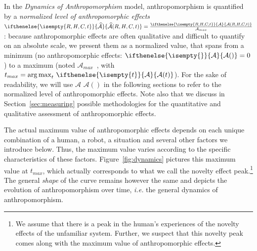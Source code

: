 \documentclass{frontiersSCNS} %
\newcommand{\ie}{\textit{i.e.}\xspace}
\newcommand{\Ant}[1][]{%
      \ifthenelse{\isempty{#1}}%
        {$\mathcal{A}$}
        {$\mathcal{A}(#1)$}
}
\newcommand{\ant}[1][]{%
      \ifthenelse{\isempty{#1}}%
        {\mathcal{A}}
        {\mathcal{A}(#1)}
}
\newcommand{\antNorm}[1][]{%
      \ifthenelse{\isempty{#1}}%
      {\widehat{\mathcal{A}}}
      {\widehat{\mathcal{A}}(#1)}
}
\newcommand{\AntMax}{{$\mathcal{A}_{max}$~}}
\newcommand{\antMax}{{\mathcal{A}_{max}}}
\begin{document}
In the \emph{Dynamics of Anthropomorphism} model, anthropomorphism is quantified
by a \emph{normalized level of anthropomorphic effects} $\antNorm[R,H,C,t] =
\frac{\ant[R,H,C,t]}{\antMax}$: because anthropomorphic effects are often
qualitative and difficult to quantify on an absolute scale, we present them as a
normalized value, that spans from a minimum (no anthropomorphic effects:
$\ant=0$) to a maximum (noted \AntMax, with $t_{max} = \operatorname{arg\,max}_t
\, \ant[t]$). For the sake of readability, we will use \Ant in the following
sections to refer to the normalized level of anthropomorphic effects. Note also
that we discuss in Section~\ref{sec:measuring} possible methodologies for the
quantitative and qualitative assessment of anthropomorphic effects.

The actual maximum value of anthropomorphic effects depends on each unique
combination of a human, a robot, a situation and several other factors we
introduce below. Thus, the maximum value varies according to the specific
characteristics of these factors. Figure~\ref{fig:dynamics} pictures this
maximum value at $t_{max}$, which actually corresponds to what we call the
novelty effect peak.\footnote{We assume that there is a peak in the human's
experiences of the novelty effects of the unfamiliar system. Further, we suspect
that this novelty peak comes along with the maximum value of anthropomorphic
effects.} The general \emph{shape} of the curve remains however the same and
depicts the evolution of anthropomorphism over time, \ie the general dynamics of
anthropomorphism.
\end{document}
